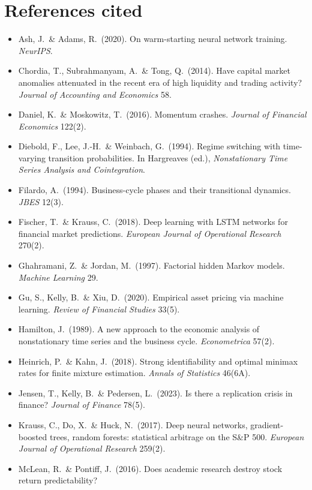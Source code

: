 \section{References cited}

{\small
\begin{itemize}[leftmargin=*,itemsep=1pt]
\item Ash, J.\ \& Adams, R.\ (2020). On warm-starting neural network training. \emph{NeurIPS}.
\item Chordia, T., Subrahmanyam, A.\ \& Tong, Q.\ (2014). Have capital market anomalies attenuated in the
  recent era of high liquidity and trading activity? \emph{Journal of Accounting and Economics} 58.
\item Daniel, K.\ \& Moskowitz, T.\ (2016). Momentum crashes. \emph{Journal of Financial Economics} 122(2).
\item Diebold, F., Lee, J.-H.\ \& Weinbach, G.\ (1994). Regime switching with time-varying transition
  probabilities. In Hargreaves (ed.), \emph{Nonstationary Time Series Analysis and Cointegration}.
\item Filardo, A.\ (1994). Business-cycle phases and their transitional dynamics. \emph{JBES} 12(3).
\item Fischer, T.\ \& Krauss, C.\ (2018). Deep learning with LSTM networks for financial market
  predictions. \emph{European Journal of Operational Research} 270(2).
\item Ghahramani, Z.\ \& Jordan, M.\ (1997). Factorial hidden Markov models. \emph{Machine Learning} 29.
\item Gu, S., Kelly, B.\ \& Xiu, D.\ (2020). Empirical asset pricing via machine learning. \emph{Review of
  Financial Studies} 33(5).
\item Hamilton, J.\ (1989). A new approach to the economic analysis of nonstationary time series and the
  business cycle. \emph{Econometrica} 57(2).
\item Heinrich, P.\ \& Kahn, J.\ (2018). Strong identifiability and optimal minimax rates for finite
  mixture estimation. \emph{Annals of Statistics} 46(6A).
\item Jensen, T., Kelly, B.\ \& Pedersen, L.\ (2023). Is there a replication crisis in finance?
  \emph{Journal of Finance} 78(5).
\item Krauss, C., Do, X.\ \& Huck, N.\ (2017). Deep neural networks, gradient-boosted trees, random forests:
  statistical arbitrage on the S\&P 500. \emph{European Journal of Operational Research} 259(2).
\item McLean, R.\ \& Pontiff, J.\ (2016). Does academic research destroy stock return predictability?

\end{itemize}}
